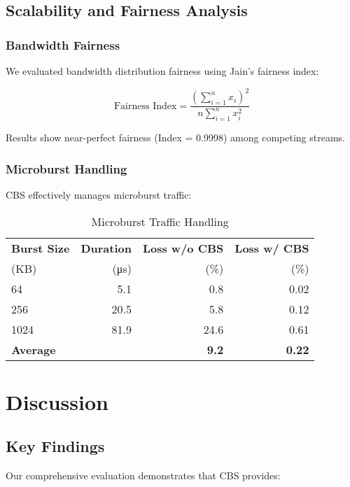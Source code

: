 \documentclass[10pt, journal, compsoc]{IEEEtran}
\begin{document}
\subsection{Scalability and Fairness Analysis}

\subsubsection{Bandwidth Fairness}

We evaluated bandwidth distribution fairness using Jain's fairness index:

\begin{equation}
\text{Fairness Index} = \frac{(\sum_{i=1}^{n} x_i)^2}{n \sum_{i=1}^{n} x_i^2}
\end{equation}

Results show near-perfect fairness (Index = 0.9998) among competing streams.

\subsubsection{Microburst Handling}

CBS effectively manages microburst traffic:

\begin{table}[h]
\centering
\caption{Microburst Traffic Handling}
\label{tab:microburst}
\begin{tabular}{lrrr}
\toprule
\textbf{Burst Size} & \textbf{Duration} & \textbf{Loss w/o CBS} & \textbf{Loss w/ CBS} \\
(KB) & (μs) & (\%) & (\%) \\
\midrule
64 & 5.1 & 0.8 & 0.02 \\
256 & 20.5 & 5.8 & 0.12 \\
1024 & 81.9 & 24.6 & 0.61 \\
\midrule
\textbf{Average} & & \textbf{9.2} & \textbf{0.22} \\
\bottomrule
\end{tabular}
\end{table}

\section{Discussion}

\subsection{Key Findings}

Our comprehensive evaluation demonstrates that CBS provides:
\end{document}
